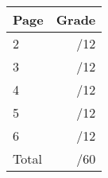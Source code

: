 \documentclass[12pt]{article}
\newcommand{\skipline}{\vspace{12pt}}
\begin{document}
\begin{table}[hbt]
\begin{center}
\begin{tabular}{|l|r|} \hline
Page&Grade\\
\hline \hline
\cline{1-2} 2 & \enspace\enspace\enspace\enspace\enspace\enspace/12\\
\cline{1-2} 3 & \enspace\enspace\enspace\enspace\enspace\enspace/12\\
\cline{1-2} 4 & \enspace\enspace\enspace\enspace\enspace\enspace/12\\
\cline{1-2} 5 & \enspace\enspace\enspace\enspace\enspace\enspace/12\\
\cline{1-2} 6 & \enspace\enspace\enspace\enspace\enspace\enspace/12\\
\cline{1-2} Total & \enspace\enspace\enspace\enspace\enspace\enspace/60\\
\hline
\end{tabular}

\skipline

\skipline

\skipline


\end{center}
\end{table}
\newpage
\end{document}
